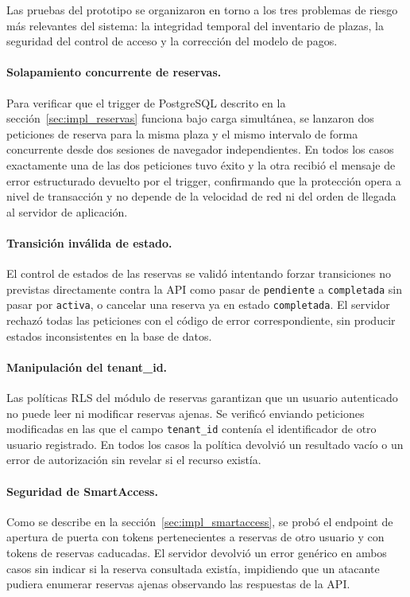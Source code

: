 Las pruebas del prototipo se organizaron en torno a los tres problemas de riesgo más relevantes del sistema: la integridad temporal del inventario de plazas, la seguridad del control de acceso y la corrección del modelo de pagos.

\paragraph{Solapamiento concurrente de reservas.} Para verificar que el trigger de PostgreSQL descrito en la sección~\ref{sec:impl_reservas} funciona bajo carga simultánea, se lanzaron dos peticiones de reserva para la misma plaza y el mismo intervalo de forma concurrente desde dos sesiones de navegador independientes. En todos los casos exactamente una de las dos peticiones tuvo éxito y la otra recibió el mensaje de error estructurado devuelto por el trigger, confirmando que la protección opera a nivel de transacción y no depende de la velocidad de red ni del orden de llegada al servidor de aplicación.

\paragraph{Transición inválida de estado.} El control de estados de las reservas se validó intentando forzar transiciones no previstas directamente contra la API como pasar de \texttt{pendiente} a \texttt{completada} sin pasar por \texttt{activa}, o cancelar una reserva ya en estado \texttt{completada}. El servidor rechazó todas las peticiones con el código de error correspondiente, sin producir estados inconsistentes en la base de datos.

\paragraph{Manipulación del tenant\_id.} Las políticas RLS del módulo de reservas garantizan que un usuario autenticado no puede leer ni modificar reservas ajenas. Se verificó enviando peticiones modificadas en las que el campo \texttt{tenant\_id} contenía el identificador de otro usuario registrado. En todos los casos la política devolvió un resultado vacío o un error de autorización sin revelar si el recurso existía.

\paragraph{Seguridad de SmartAccess.} Como se describe en la sección~\ref{sec:impl_smartaccess}, se probó el endpoint de apertura de puerta con tokens pertenecientes a reservas de otro usuario y con tokens de reservas caducadas. El servidor devolvió un error genérico en ambos casos sin indicar si la reserva consultada existía, impidiendo que un atacante pudiera enumerar reservas ajenas observando las respuestas de la API.

